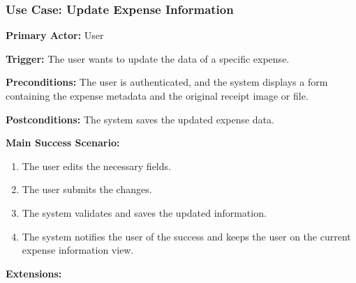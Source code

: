 \subsubsection{\textbf{Use Case: Update Expense Information}}

\textbf{Primary Actor:} User

\textbf{Trigger:} The user wants to update the data of a specific expense.

\textbf{Preconditions:} The user is authenticated, and the system displays a form containing the expense metadata and the original receipt image or file.

\textbf{Postconditions:} The system saves the updated expense data.

\vspace{0.5cm}

\textbf{Main Success Scenario:}

\begin{enumerate} [leftmargin=0.75cm, noitemsep]
\item The user edits the necessary fields.
\item The user submits the changes.
\item The system validates and saves the updated information.
\item The system notifies the user of the success and keeps the user on the current expense information view.
\end{enumerate}

\vspace{0.3cm}

\textbf{Extensions:}

